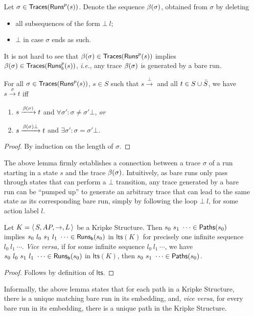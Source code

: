 \documentclass{llncs}
\newcommand{\ltstrans}[1]{\xrightarrow{#1}}
\newcommand{\kstrans}{\to}
\newcommand{\lts}{\mathsf{lts}}
\newcommand{\ie}{\emph{i.e.}}
\begin{document}
\begin{definition} Let $\sigma \in \mathsf{Traces}(\mathsf{Runs}^p(s))$.
Denote the sequence $\beta(\sigma)$, obtained from $\sigma$
by deleting
\begin{itemize}
\item all subsequences of the form $\bot\ l$;
\item $\bot$ in case $\sigma$ ends
as such.
\end{itemize}
\end{definition}
It is not hard to see that $\beta(\sigma) \in \mathsf{Traces}(\mathsf{Runs}^p(s))$
implies $\beta(\sigma) \in \mathsf{Traces}(\mathsf{Runs}^p_b(s))$, \ie,
any trace $\beta(\sigma)$ is generated by a bare run.
\begin{lemma}
\label{lem:bare_vs_ordinary}
For all $\sigma \in \mathsf{Traces}(\mathsf{Runs}^p(s))$, $s \in S$ such that
$s \ltstrans{\bot}$ and all $t \in S \cup \bar{S}$, we have
$s \xrightarrow{\sigma} t$ iff
\begin{enumerate}
\item
$s \xrightarrow{\beta(\sigma)} t$ and
$\forall \sigma': \sigma \not= \sigma'\bot$, \emph{or}

\item $s \xrightarrow{\beta(\sigma)\bot} t$ and
$\exists \sigma': \sigma = \sigma'\bot$.

\end{enumerate}

\end{lemma}
\begin{proof} By induction on the length of $\sigma$.
\end{proof}
The above lemma firmly establishes a connection between a trace $\sigma$
of a run starting in a state $s$ and the trace $\beta(\sigma)$. Intuitively,
as bare runs only pass through states that can perform a $\bot$
transition, any trace generated by a bare run can be ``pumped up'' to generate
an arbitrary trace that can lead to the same state as its corresponding
bare run, simply by following the loop $\bot\ l$, for some action label $l$.

\begin{lemma}
\label{lem:bareruns1}
Let $K = \tuple{S, \AP, \kstrans,  L}$ be a Kripke Structure.
Then
$s_0\ s_1\ \cdots \in \mathsf{Paths}(s_0)$ implies
$s_0\ l_0\ s_1\ l_1\ \cdots \in \bareruns{s_0}$ in $\lts(K)$
for precisely one
infinite sequence $l_0\ l_1\ \cdots$. \emph{Vice versa,}
if for some infinite sequence $l_0\ l_1\ \cdots$, we have
$s_0\ l_0\ s_1\ l_1\ \cdots \in \bareruns{s_0}$ in $\lts(K)$,
then $s_0\ s_1\ \cdots \in \mathsf{Paths}(s_0)$.
\end{lemma}
\begin{proof}
Follows by definition of $\lts$.
\end{proof}
Informally, the above lemma states that for each path in a Kripke
Structure, there is a unique matching bare run in its \LTS embedding,
and, \emph{vice versa}, for every bare run in its \LTS embedding, there
is a unique path in the Kripke Structure.
\end{document}
